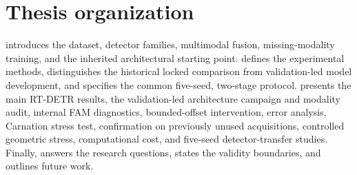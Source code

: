 \section{Thesis organization}

 introduces the dataset, detector families, multimodal
fusion, missing-modality training, and the inherited architectural starting
point.  defines the experimental methods, distinguishes
the historical locked comparison from validation-led model development, and
specifies the common five-seed, two-stage protocol.
 presents the main RT-DETR results, the validation-led
architecture campaign and modality audit, internal FAM diagnostics,
bounded-offset intervention, error analysis, Carnation stress test,
confirmation on previously unused acquisitions, controlled geometric stress,
computational cost, and five-seed detector-transfer studies.
Finally,  answers the research questions, states the validity
boundaries, and outlines future work.
